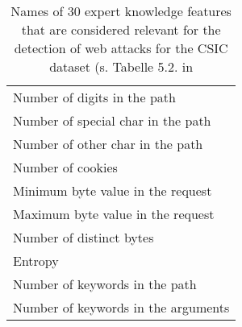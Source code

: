 \begin{table}[h]
\begin{tabular}{|l|}
    Number of digits in the path\\
    Number of special char in the path\\
    Number of other char in the path\\
    Number of cookies\\
    Minimum byte value in the request\\
    Maximum byte value in the request\\
    Number of distinct bytes\\
    Entropy\\
    Number of keywords in the path\\
    Number of keywords in the arguments\\
    \hline
  \end{tabular}
  \caption{Names of 30 expert knowledge features that are considered relevant for the detection of web attacks for the CSIC dataset (s. Tabelle 5.2. in \cite{gimenez2015}}
  \label{tab:tgfeatures}
\end{table}
